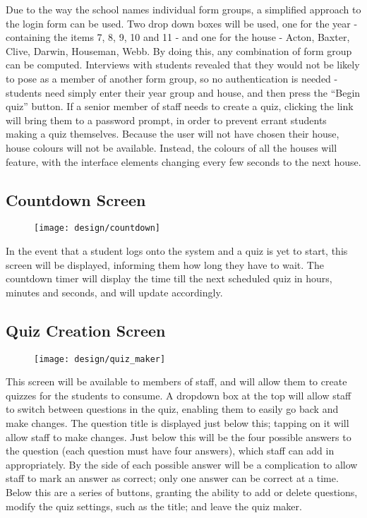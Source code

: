 Due to the way the school names individual form groups, a simplified approach to the login form can be used. Two drop down boxes will be used, one for the year - containing the items 7, 8, 9, 10 and 11 - and one for the house - Acton, Baxter, Clive, Darwin, Houseman, Webb. By doing this, any combination of form group can be computed. Interviews with students revealed that they would not be likely to pose as a member of another form group, so no authentication is needed - students need simply enter their year group and house, and then press the ``Begin quiz'' button. If a senior member of staff needs to create a quiz, clicking the link will bring them to a password prompt, in order to prevent errant students making a quiz themselves. Because the user will not have chosen their house, house colours will not be available. Instead, the colours of all the houses will feature, with the interface elements changing every few seconds to the next house.

\subsection{Countdown Screen}
\begin{figure}[h!]
  \texttt{[image: design/countdown]}
\end{figure}

In the event that a student logs onto the system and a quiz is yet to start, this screen will be displayed, informing them how long they have to wait. The countdown timer will display the time till the next scheduled quiz in hours, minutes and seconds, and will update accordingly.

\clearpage

\subsection{Quiz Creation Screen}
\begin{figure}[h!]
  \texttt{[image: design/quiz\_maker]}
\end{figure}

This screen will be available to members of staff, and will allow them to create quizzes for the students to consume. A dropdown box at the top will allow staff to switch between questions in the quiz, enabling them to easily go back and make changes. The question title is displayed just below this; tapping on it will allow staff to make changes. Just below this will be the four possible answers to the question (each question must have four answers), which staff can add in appropriately. By the side of each possible answer will be a complication to allow staff to mark an answer as correct; only one answer can be correct at a time. Below this are a series of buttons, granting the ability to add or delete questions, modify the quiz settings, such as the title; and leave the quiz maker.

